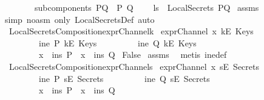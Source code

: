 \begin{isabellebody}
\ \ \ \ \ \ \ \ {\isachardoublequoteopen}subcomponents\ PQ\ {\isacharequal}\ {\isacharbraceleft}P{\isacharcomma}\ Q{\isacharbraceright}{\isachardoublequoteclose}\isanewline
{}\ \ \ \ {\isachardoublequoteopen}ls\ {\isasymin}\ LocalSecrets\ PQ{\isachardoublequoteclose}\isanewline
%
\isadelimproof
%
\endisadelimproof
%
\isatagproof
{}\isamarkupfalse%
\ assms\ \isamarkupfalse%
\ {\isacharparenleft}simp\ {\isacharparenleft}no{\isacharunderscore}asm{\isacharparenright}\ only{\isacharcolon}\ LocalSecretsDef{\isacharcomma}\ auto{\isacharparenright}%
\endisatagproof
{\isafoldproof}%
%
\isadelimproof
\isanewline
%
\endisadelimproof
\isanewline
{}\isamarkupfalse%
\ \ LocalSecretsComposition{\isacharunderscore}exprChannel{\isacharunderscore}k{\isacharcolon}\isanewline
{}\ {\isachardoublequoteopen}exprChannel\ x\ {\isacharparenleft}kE\ Keys{\isacharparenright}{\isachardoublequoteclose}\isanewline
\ \ \ \ \ \ \ \ {\isachardoublequoteopen}{\isasymnot}\ ine\ P\ {\isacharparenleft}kE\ Keys{\isacharparenright}{\isachardoublequoteclose}\isanewline
\ \ \ \ \ \ \ \ {\isachardoublequoteopen}{\isasymnot}\ ine\ Q\ {\isacharparenleft}kE\ Keys{\isacharparenright}{\isachardoublequoteclose}\isanewline
\ \ \ \ \ \ \ \ {\isachardoublequoteopen}{\isasymnot}\ {\isacharparenleft}x\ {\isasymnotin}\ ins\ P\ {\isasymand}\ x\ {\isasymnotin}\ ins\ Q{\isacharparenright}{\isachardoublequoteclose}\isanewline
{}\ {\isachardoublequoteopen}False{\isachardoublequoteclose}\isanewline
%
\isadelimproof
%
\endisadelimproof
%
\isatagproof
{}\isamarkupfalse%
\ assms\ \isamarkupfalse%
\ {\isacharparenleft}metis\ ine{\isacharunderscore}def{\isacharparenright}%
\endisatagproof
{\isafoldproof}%
%
\isadelimproof
\isanewline
%
\endisadelimproof
\isanewline
{}\isamarkupfalse%
\ \ LocalSecretsComposition{\isacharunderscore}exprChannel{\isacharunderscore}s{\isacharcolon}\isanewline
{}\ {\isachardoublequoteopen}exprChannel\ x\ {\isacharparenleft}sE\ Secrets{\isacharparenright}{\isachardoublequoteclose}\isanewline
\ \ \ \ \ \ \ \ {\isachardoublequoteopen}{\isasymnot}\ ine\ P\ {\isacharparenleft}sE\ Secrets{\isacharparenright}{\isachardoublequoteclose}\isanewline
\ \ \ \ \ \ \ \ {\isachardoublequoteopen}{\isasymnot}\ ine\ Q\ {\isacharparenleft}sE\ Secrets{\isacharparenright}{\isachardoublequoteclose}\isanewline
\ \ \ \ \ \ \ \ {\isachardoublequoteopen}{\isasymnot}\ {\isacharparenleft}x\ {\isasymnotin}\ ins\ P\ {\isasymand}\ x\ {\isasymnotin}\ ins\ Q{\isacharparenright}{\isachardoublequoteclose}\isanewline

\end{isabellebody}
